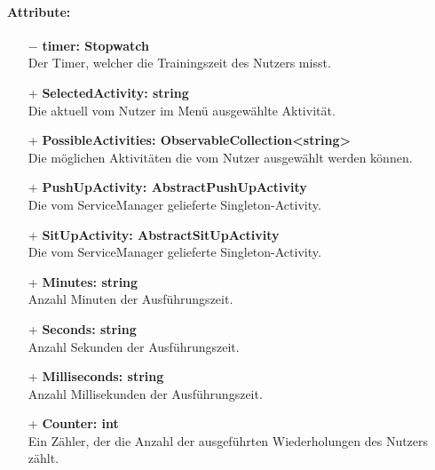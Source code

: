 \documentclass[a4paper,12pt]{article}
\begin{document}
\paragraph{Attribute:}
\begin{itemize}
	\item[$-$] \textbf{timer: Stopwatch} \\ Der Timer, welcher die Trainingszeit des Nutzers misst.
	\item[+] \textbf{SelectedActivity: string} \\ Die aktuell vom Nutzer im Menü ausgewählte Aktivität. 
	\item[+] \textbf{PossibleActivities: ObservableCollection<string>} \\ Die möglichen Aktivitäten die vom Nutzer ausgewählt werden können. 
	\item[+] \textbf{PushUpActivity: AbstractPushUpActivity} \\ Die vom ServiceManager gelieferte Singleton-Activity.
	\item[+] \textbf{SitUpActivity: AbstractSitUpActivity} \\ Die vom ServiceManager gelieferte Singleton-Activity. 
	\item[+] \textbf{Minutes: string} \\ Anzahl Minuten der Ausführungszeit. 
	\item[+] \textbf{Seconds: string} \\ Anzahl Sekunden der Ausführungszeit. 
	\item[+] \textbf{Milliseconds: string} \\ Anzahl Millisekunden der Ausführungszeit. 
	\item[+] \textbf{Counter: int} \\ Ein Zähler, der die Anzahl der ausgeführten Wiederholungen des Nutzers zählt. 
\end{itemize}
\end{document}
